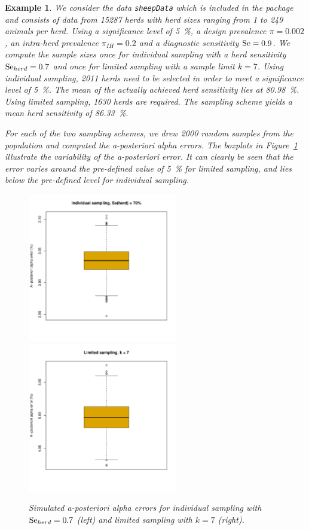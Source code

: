 \documentclass[nojss]{jss}
\newtheorem{example}{Example}[section]
\begin{document}
%
\begin{example} \label{ex:a_post_error1}
%
We consider the data \texttt{sheepData} which is included in the package and consists of data from 15287 herds with herd sizes ranging from 1 to 249 animals per herd. Using a significance level of 5~\%, a design prevalence $\pi = 0.002$, an intra-herd prevalence $\pi_{IH} = 0.2$ and a diagnostic sensitivity $\mbox{Se} = 0.9$. We compute the sample sizes once for individual sampling with a herd sensitivity $\mbox{Se}_{herd} = 0.7$ and once for limited sampling with a sample limit $k = 7$. Using individual sampling, 2011 herds need to be selected in order to meet a significance level of 5~\%. The mean of the actually achieved herd sensitivity lies at 80.98~\%. Using limited sampling, 1630 herds are required. The sampling scheme yields a mean herd sensitivity of 86.33~\%.

For each of the two sampling schemes, we drew 2000 random samples from the population and computed the a-posteriori alpha errors. The boxplots in Figure~\ref{fig:aPostError_2} illustrate the variability of the a-posteriori error. It can clearly be seen that the error varies around the pre-defined value of 5~\% for limited sampling, and lies below the pre-defined level for individual sampling. %

\begin{figure}[h!t]
\begin{center}
\includegraphics[width=65mm]{aPostError_ind7}\quad \includegraphics[width=65mm]{aPostError_ltd7}
\end{center}
\caption{Simulated a-posteriori alpha errors for individual sampling with $\mbox{Se}_{herd} = 0.7$ (left) and limited sampling with $k = 7$ (right).}
\label{fig:aPostError_2}
\end{figure}
%
\end{example}
%
\end{document}
